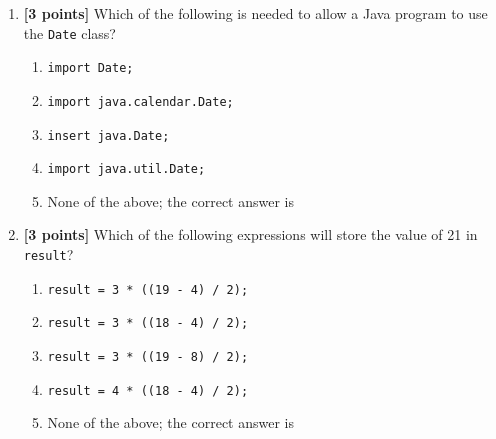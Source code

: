 \begin{enumerate}
\bigskip
\bigskip

\item {\bf [3 points]}
  Which of the following is needed to allow a Java program to use the {\tt Date} class?
  \begin{enumerate}
    \item {\tt import Date;}
      \medskip 
    \item {\tt import java.calendar.Date;}
      \medskip 
    \item {\tt insert java.Date;}
      \medskip
    \item {\tt import java.util.Date;}
      \medskip
    \item None of the above; the correct answer is \underline{\hspace{3in}}
  \end{enumerate}

\bigskip
\bigskip


\item {\bf [3 points]}
  Which of the following expressions will store the value of 21 in {\tt result}?
\begin{enumerate}
  \item {\tt result = 3 * ((19 - 4) / 2);}
\medskip 
  \item {\tt result = 3 * ((18 - 4) / 2);}
\medskip 
  \item {\tt result = 3 * ((19 - 8) / 2);}
\medskip
  \item {\tt result = 4 * ((18 - 4) / 2);}
\medskip
\item None of the above; the correct answer is \underline{\hspace{3in}}
\end{enumerate}


\bigskip
\bigskip

\end{enumerate}


